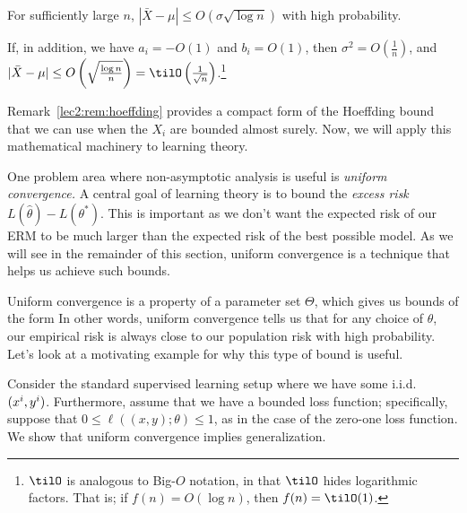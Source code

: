 \begin{remark}
    For sufficiently large $n$, $|\bar{X} - \mu | \leq O(\sigma \sqrt{\log{n}})$ with high probability.
\end{remark}

\begin{remark}\label{lec2:rem:hoeffding}
    If, in addition, we have $a_i = -O(1)$ and $b_i = O(1)$, then $\sigma^2 = O \left( \frac{1}{n}\right)$, and $|\bar{X} - \mu | \leq O\left(\sqrt{\frac{\log n}{n}}\right) = \tilO\left(\frac{1}{\sqrt{n}}\right)$.\footnote{$\tilO$ is analogous to Big-$O$ notation, in that $\tilO$ hides logarithmic factors. That is; if $f(n) = O(\log n)$, then $f(n) = \tilO(1)$.}
\end{remark}

Remark~\ref{lec2:rem:hoeffding} provides a compact form of the Hoeffding bound that we can use when the $X_i$ are bounded almost surely. Now, we will apply this mathematical machinery to learning theory.


One problem area where non-asymptotic analysis is useful is \emph{uniform convergence.} A central goal of learning theory is to bound the \emph{excess risk} $L(\hat{\theta}) - L(\theta^*)$. This is important as we don't want the expected risk of our ERM to be much larger than the expected risk of the best possible model. As we will see in the remainder of this section, uniform convergence is a technique that helps us achieve such bounds.

Uniform convergence is a property of a parameter set $\Theta$, which gives us bounds of the form
In other words, uniform convergence tells us that for any choice of $\theta$, our empirical risk is always close to our population risk with high probability. Let's look at a motivating example for why this type of bound is useful.


Consider the standard supervised learning setup where we have some i.i.d. $(x\sp{i}, y\sp{i})$. Furthermore, assume that we have a bounded loss function; specifically, suppose that $0 \leq \ell((x, y); \theta) \leq 1$, as in the case of the zero-one loss function. We show that uniform convergence implies generalization.

